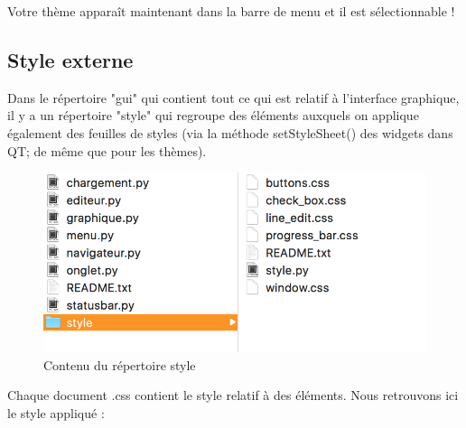 \documentclass[a4paper,12pt]{article}
\begin{document}
			Votre thème apparaît maintenant dans la barre de menu et il est sélectionnable !
					
		\subsection{Style externe}
	
		Dans le répertoire "gui" qui contient tout ce qui est relatif à l'interface graphique, il y a un répertoire "style" qui regroupe des éléments auxquels on applique également des feuilles de styles (via la méthode setStyleSheet() des widgets dans QT; de même que pour les thèmes).
		
		\begin{figure}[h!]
			\begin{center}
				\includegraphics[scale=1]{images/imgs_themes/style}
				\caption{Contenu du répertoire style}
			\end{center}
		\end{figure}
				
		Chaque document .css contient le style relatif à des éléments. Nous retrouvons ici le style appliqué :
		
\end{document}
